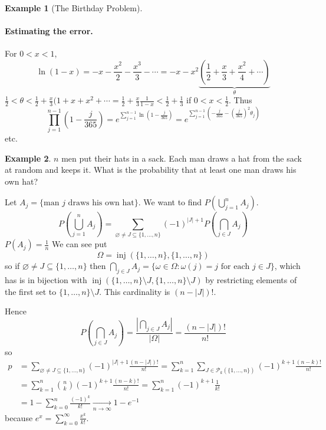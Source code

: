 \documentclass{article}
\DeclareMathOperator{\inj}{inj}
\newcommand{\p}[1]{\left(#1\right)} %
\theoremstyle{definition}
\newtheorem*{example}{Example}
\begin{document}
\begin{example}[The Birthday Problem]
\paragraph{Estimating the error.} For $0 < x < 1$,
\[
    \ln(1 - x) = - x - \frac{x^2}{2} - \frac{x^3}{3} - \cdots = -x - x^2\underbrace{\p{\frac{1}{2} + \frac{x}{3} + \frac{x^2}{4} + \cdots}}_{\theta}
\]
$\frac{1}{2} < \theta < \frac{1}{2} + \frac{x}{3}(1 + x + x^2 + \cdots = \frac{1}{2} + \frac{x}{3}\frac{1}{1-x} < \frac{1}{2} + \frac{1}{3}$ if $0 < x < \frac{1}{2}$. Thus
\[
    \prod_{j=1}^{n-1}\p{1 - \frac{j}{365}}
    = e^{\sum_{j=1}^{n-1}\ln\p{1 - \frac{j}{365}}}
    = e^{\sum_{j=1}^{n-1}\p{-\frac{j}{365} - \p{\frac{j}{365}}^2 \theta_j}}
\]
etc.
\end{example}
\begin{example}
$n$ men put their hats in a sack. Each man draws a hat from the sack at random and keeps it. What is the probability that at least one man draws his own hat?

Let $A_j = \{\text{man } j \text{ draws his own hat}\}$. We want to find $P\p{\bigcup_{j=1}^n A_j}$.
\[
    P\p{\bigcup_{j=1}^n A_j} = \sum_{\varnothing \neq J \subseteq \{1, \ldots, n\}} (-1)^{|J|+1} P\p{\bigcap_{j \in J} A_j}
\]
$P(A_j) = \frac{1}{n}$
We can see put
\[
    \Omega = \inj(\{1, \ldots, n\}, \{1, \ldots, n\})
\]
so if $\varnothing \neq J \subseteq \{1, \ldots, n\}$ then $\bigcap_{j \in J} A_j = \{\omega \in \Omega : \omega(j) = j \text{ for each } j \in J\}$, which has is in bijection with $\inj(\{1, \ldots, n\} \setminus J, \{1, \ldots, n\}\setminus J)$ by restricting elements of the first set to $\{1, \ldots, n\}\setminus J$. This cardinality is $(n-|J|)!$.

Hence
\[
    P\p{\bigcap_{j \in J} A_j} = \frac{|\bigcap_{j \in J} A_j|}{|\Omega|}
        = \frac{(n-|J|)!}{n!}
\]
so
\begin{align*}
    p &= \sum_{\varnothing \neq J \subseteq \{1, \ldots, n\}} (-1)^{|J|+1} \frac{(n-|J|)!}{n!} = \sum_{k=1}^n \sum_{J \in \mathcal{P}_k(\{1, \ldots, n\})} (-1)^{k+1} \frac{(n-k)!}{n!} \\
    &= \sum_{k=1}^n \binom{n}{k}(-1)^{k+1}\frac{(n-k)!}{n!} = \sum_{k=1}^n (-1)^{k+1}\frac{1}{k!} \\
    &= 1 - \sum_{k=0}^n \frac{(-1)^k}{k!} \xrightarrow[n \to \infty]{} 1 - e^{-1}
\end{align*}
because $e^x = \sum_{k=0}^\infty \frac{x^k}{k!}$.
\end{example}
\end{document}
